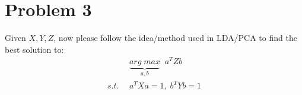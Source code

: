 \documentclass[11pt]{article}
\begin{document}
%

\section*{Problem 3}
Given $X, Y, Z$, now please follow the idea/method used in LDA/PCA to find the best solution to:
\begin{equation}
\begin{aligned}
&\underbrace{arg\;max}_{a,b}\;\;{a^TZb}\\
s.t. \ \ &a^TXa =1,\; b^TYb =1
\end{aligned}
\end{equation}
\end{document}
